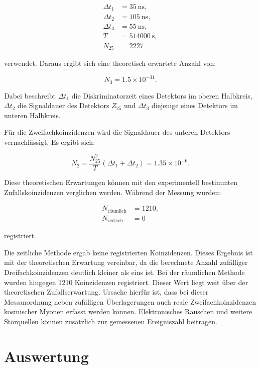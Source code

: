 \begin{align}
    \Delta t_1 &= \SI{35}{\nano\second},\\
    \Delta t_2 &= \SI{105}{\nano\second},\\
    \Delta t_3 &= \SI{55}{\nano\second},\\
    T &= \SI{514000}{\second},\\
    N_{25} &= 2227
\end{align}

verwendet. Daraus ergibt sich eine theoretisch erwartete Anzahl von:

\begin{equation}
    N_3 = 1.5\times10^{-31}.
\end{equation}

Dabei beschreibt $\Delta t_1$ die Diskriminatorzeit eines Detektors im oberen Halbkreis,
$\Delta t_2$ die Signaldauer des Detektors $Z_{25}$ und $\Delta t_3$ diejenige eines
Detektors im unteren Halbkreis.

Für die Zweifachkoinzidenzen wird die Signaldauer des unteren Detektors vernachlässigt.
Es ergibt sich:

\begin{equation}
    N_2
    =
    \frac{N_{25}^{2}}{T}
    \left(\Delta t_1+\Delta t_2\right)
    =
    1.35\times10^{-6}.
\end{equation}

Diese theoretischen Erwartungen können mit den experimentell bestimmten
Zufallskoinzidenzen verglichen werden. Während der Messung wurden:

\begin{align}
    N_{\mathrm{räumlich}} &= 1210,\\
    N_{\mathrm{zeitlich}} &= 0
\end{align}

registriert.

Die zeitliche Methode ergab keine registrierten Koinzidenzen. Dieses Ergebnis ist mit der theoretischen Erwartung vereinbar, da die berechnete Anzahl zufälliger Dreifachkoinzidenzen deutlich kleiner als eins ist. Bei der räumlichen Methode wurden hingegen 1210 Koinzidenzen registriert. Dieser Wert liegt weit über der theoretischen Zufallserwartung. Ursache hierfür ist, dass bei dieser Messanordnung neben zufälligen Überlagerungen auch reale Zweifachkoinzidenzen kosmischer Myonen erfasst werden können. Elektronisches Rauschen und weitere Störquellen können zusätzlich zur gemessenen Ereigniszahl beitragen.


\section{Auswertung}

